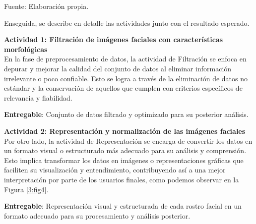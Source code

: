 \begin{flushleft}
	\small Fuente: Elaboración propia.
\end{flushleft}

Enseguida, se describe en detalle las actividades junto con el resultado esperado.

\textbf{Actividad 1: Filtración de imágenes faciales con características morfológicas}
\\
En la fase de preprocesamiento de datos, la actividad de Filtración se enfoca en depurar y mejorar la calidad del conjunto de datos al eliminar información irrelevante o poco confiable. Esto se logra a través de la eliminación de datos no estándar y la conservación de aquellos que cumplen con criterios específicos de relevancia y fiabilidad. 

\textbf{Entregable}: Conjunto de datos filtrado y optimizado para su posterior análisis.

\textbf{Actividad 2: Representación y normalización de las imágenes faciales}
\\
Por otro lado, la actividad de Representación se encarga de convertir los datos en un formato visual o estructurado más adecuado para su análisis y comprensión. Esto implica transformar los datos en imágenes o representaciones gráficas que faciliten su visualización y entendimiento, contribuyendo así a una mejor interpretación por parte de los usuarios finales, como podemos observar en la Figura \ref{3:fig4}.

\textbf{Entregable}: Representación visual y estructurada de cada rostro facial en un formato adecuado para su procesamiento y análisis posterior.

